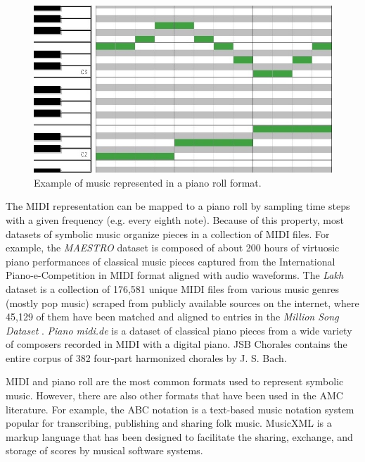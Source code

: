 \begin{figure}[!h]
 \centering
 \includegraphics[width=\columnwidth]{imgs/background/piano_roll.jpg}
 \caption{Example of music represented in a piano roll format.}
 \label{fig:piano_roll}
\end{figure}


The MIDI representation can be mapped to a piano roll by sampling time steps with a given frequency (e.g. every eighth note). Because of this property, most datasets of symbolic music organize pieces in a collection of MIDI files. For example, the \textit{MAESTRO} dataset \cite{hawthorne2018enabling} is composed of about 200 hours of virtuosic piano performances of classical music pieces captured from the International Piano-e-Competition \cite{yamahaEPiano} in MIDI format aligned with audio waveforms. The \textit{Lakh} \cite{raffel2016learning} dataset is a collection of 176,581 unique MIDI files from various music genres (mostly pop music) scraped from publicly available sources on the internet, where 45,129 of them have been matched and aligned to entries in the \textit{Million Song Dataset} \cite{bertin2011million}. \textit{Piano midi.de} is a dataset of classical piano pieces from a wide variety of composers recorded in MIDI with a digital piano. JSB Chorales \cite{boulanger2012modeling} contains the entire corpus of 382 four-part harmonized chorales by J. S. Bach.

MIDI and piano roll are the most common formats used to represent symbolic music. However, there are also other formats that have been used in the AMC literature. For example, the ABC notation \cite{walshaw1993abc2mtex} is a text-based music notation system popular for transcribing,
publishing and sharing folk music. MusicXML \cite{good2001musicxml} is a markup language that has been designed to facilitate the sharing, exchange, and storage of scores by musical software systems.


